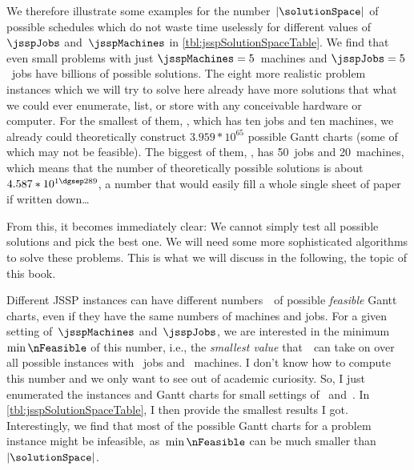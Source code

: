 We therefore illustrate some examples for the number~$\left|\solutionSpace\right|$ of possible schedules which do not waste time uselessly for different values of~$\jsspJobs$ and~$\jsspMachines$ in \autoref{tbl:jsspSolutionSpaceTable}.
We find that even small problems with just $\jsspMachines=5$~machines and $\jsspJobs=5$~jobs have billions of possible solutions.
The eight more realistic problem instances which we will try to solve here already have more solutions that what we could ever enumerate, list, or store with any conceivable hardware or computer.
For the smallest of them, , which has ten jobs and ten machines, we already could theoretically construct $3.959*10^{65}$ possible Gantt charts (some of which may not be feasible).
The biggest of them, , has 50~jobs and 20~machines, which means that the number of theoretically possible solutions is about $4.587*10^{1\dgsep289}$, a number that would easily fill a whole single sheet of paper if written down\dots\relax

From this, it becomes immediately clear:
We cannot simply test all possible solutions and pick the best one.
We will need some more sophisticated algorithms to solve these problems.
This is what we will discuss in the following, the topic of this book.

Different \gls{JSSP} instances can have different numbers~\nFeasible\ of possible \emph{feasible} Gantt charts, even if they have the same numbers of machines and jobs.
For a given setting of~$\jsspMachines$ and~$\jsspJobs$, we are interested in the minimum~$\min\nFeasible$ of this number, i.e., the \emph{smallest value} that~\nFeasible\ can take on over all possible instances with \jsspJobs~jobs and \jsspMachines~machines.
I don't know how to compute this number and we only want to see out of academic curiosity.
So, I just enumerated the instances and Gantt charts for small settings of \jsspMachines\ and~\jsspJobs.
In \autoref{tbl:jsspSolutionSpaceTable}, I then provide the smallest results I got.
Interestingly, we find that most of the possible Gantt charts for a problem instance might be infeasible, as~$\min\nFeasible$ can be much smaller than~$\left|\solutionSpace\right|$.
\endhsection%
\endhsection%
